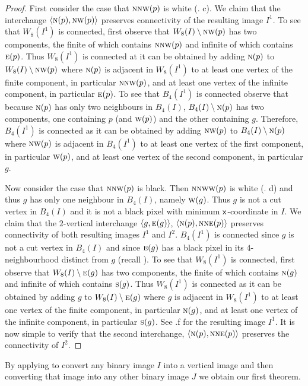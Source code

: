\documentclass[lotsofwhite,charterfonts]{patmorin}
\newcommand{\N}{\textsc{n}}
\newcommand{\NE}{\textsc{ne}}
\newcommand{\E}{\textsc{e}}
\renewcommand{\S}{\textsc{s}}
\newcommand{\W}{\textsc{w}}
\newcommand{\NW}{\textsc{nw}}
\newcommand{\x}{\ensuremath{\protect\textup{\textsf{x}}}}
\newcommand{\ic}[2]{\langle #1,#2 \rangle}
\newcommand{\sm}{\ensuremath{\setminus}}
\begin{document}
\begin{proof}
First consider the case that $\N\NW(p)$ is white (. c). We claim that the interchange $\ic{\N(p)}{\NW(p)}$ preserves connectivity of the resulting image $I^1$. To see that $W_8(I^1)$ is connected, first observe that $W_8(I)\sm \NW(p)$ has two components, the finite of which contains $\N\NW(p)$ and infinite of which contains $\E(p)$. Thus $W_8(I^1)$ is connected at it can be obtained by adding $\N(p)$ to $W_8(I)\sm \NW(p)$ where $\N(p)$ is adjacent in $W_8(I^1)$ to at least one vertex of the finite component, in particular $\N\NW(p)$, and at least one vertex of the infinite component, in particular $\E(p)$. To see that $B_4(I^1)$ is connected observe that because $\N(p)$ has only two neighbours in $B_4(I)$, $B_4(I)\sm \N(p)$ has two components, one containing $p$ (and $\W(p)$) and the other containing $g$. Therefore, $B_4(I^1)$ is connected as it can be obtained by adding $\NW(p)$ to $B_4(I)\sm \N(p)$ where $\NW(p)$ is adjacent in $B_4(I^1)$ to at least one vertex of the first component, in particular $\W(p)$, and at least one vertex of the second component, in particular $g$.

Now consider the case that $\N\NW(p)$ is black. Then $\N\NW\W(p)$ is white (. d) and thus $g$ has only one neighbour in $B_4(I)$, namely $\W(g)$. Thus $g$ is not a cut vertex in $B_4(I)$ and it is not a black pixel with minimum \x-coordinate in $I$. We claim that the $2$-vertical interchange $\ic{g}{\E(g)}$, $\ic{\N(p)}{\N\NE(p)}$ preserves connectivity of both resulting images $I^1$ and $I^2$. $B_4(I^1)$ is connected since $g$ is not a cut vertex in $B_4(I)$ and since $\E(g)$ has a black pixel in its $4$-neighbourhood distinct from $g$ (recall ). To see that $W_8(I^1)$ is connected, first observe that $W_8(I)\sm \E(g)$  has two components, the finite of which contains $\N(g)$ and infinite of which contains $\S(g)$. Thus $W_8(I^1)$ is connected as it can be obtained by adding $g$ to $W_8(I)\sm \E(g)$  where $g$ is adjacent in $W_8(I^1)$ to at least one vertex of the finite component, in particular $\N(g)$, and at least one vertex of the infinite component, in particular $\S(g)$. See .f for the resulting image $I^1$. It is now simple to verify that the second interchange, $\ic{\N(p)}{\N\NE(p)}$ preserves the connectivity of $I^2$.
\end{proof}

By applying  to convert any binary image $I$ into a
vertical image and then converting that image  into any
other binary image $J$ we obtain our first theorem.
\end{document}
